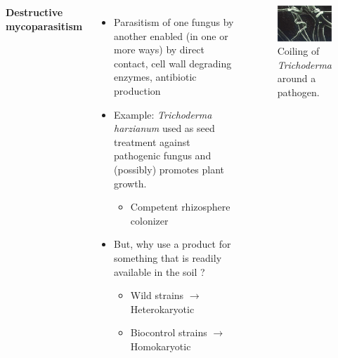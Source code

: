 \documentclass[11pt,dvipsnames,ignorenonframetext,aspectratio=169]{beamer}
\providecommand{\tightlist}{%
  \setlength{\itemsep}{0pt}\setlength{\parskip}{0pt}}
\newcommand{\bcolumns}{\begin{columns}[T, onlytextwidth]}
\newcommand{\ecolumns}{\end{columns}}
\begin{document}
\begin{frame}{}
\protect\hypertarget{section-13}{}
\bcolumns
{}

\textbf{Destructive mycoparasitism}

\begin{itemize}
\tightlist
\item
  Parasitism of one fungus by another enabled (in one or more ways) by
  direct contact, cell wall degrading enzymes, antibiotic production
\item
  Example: \emph{Trichoderma harzianum} used as seed treatment against
  pathogenic fungus and (possibly) promotes plant growth.

  \begin{itemize}
  \tightlist
  \item
    Competent rhizosphere colonizer
  \end{itemize}
\item
  But, why use a product for something that is readily available in the
  soil ?

  \begin{itemize}
  \tightlist
  \item
    Wild strains \(\longrightarrow\) Heterokaryotic
  \item
    Biocontrol strains \(\longrightarrow\) Homokaryotic
  \end{itemize}
\end{itemize}


\begin{figure}
\includegraphics[width=0.9\linewidth]{../images/trichoderma_coiling_around_pathogen} \caption{Coiling of \textit{Trichoderma} around a pathogen.}\label{fig:trichoderma-coiling}
\end{figure}

\ecolumns
\end{frame}
\end{document}
